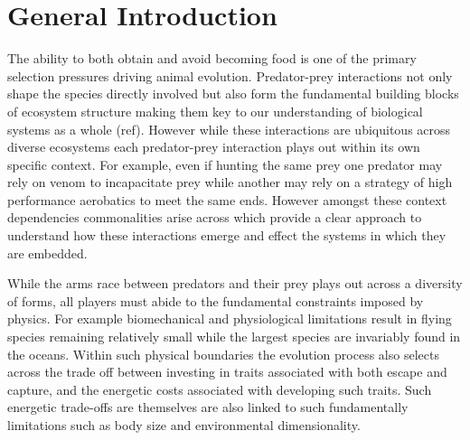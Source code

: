 \chapter{General Introduction}
\label{chap:introduction}%


\noindent
The ability to both obtain and avoid becoming food is one of the primary selection pressures driving animal evolution. Predator-prey interactions not only shape the species directly involved but also form the fundamental building blocks of ecosystem structure making them key to our understanding of biological systems as a whole (ref). However while these interactions are ubiquitous across diverse ecosystems each predator-prey interaction plays out within its own specific context. For example, even if hunting the same prey one predator may rely on venom to incapacitate prey while another may rely on a strategy of high performance aerobatics to meet the same ends. However amongst these context dependencies commonalities arise across which provide a clear approach to understand how these interactions emerge and effect the systems in which they are embedded.


While the arms race between predators and their prey plays out across a diversity of forms, all players must abide to the fundamental constraints imposed by physics. For example biomechanical and physiological limitations result in flying species remaining relatively small while the largest species are invariably found in the oceans. Within such physical boundaries the evolution process also selects across the trade off between investing in traits associated with both escape and capture, and the energetic costs associated with developing such traits. Such energetic trade-offs are themselves are also linked to such fundamentally limitations such as body size and environmental dimensionality. 



